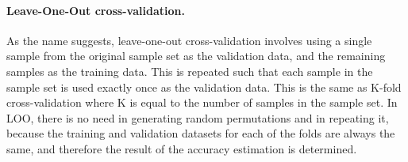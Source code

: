 \paragraph{Leave-One-Out cross-validation.}
As the name suggests, leave-one-out cross-validation involves using a single sample from the original sample set as the validation data, and the remaining samples as the training data. This is repeated such that each sample in the sample set is used exactly once as the validation data. This is the same as K-fold cross-validation where K is equal to the number of samples in the sample set.
In LOO, there is no need in generating random permutations and in repeating it, because the training and validation datasets for each of the folds are always the same, and therefore the result of the accuracy estimation is determined.

